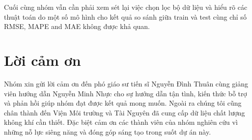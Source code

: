 \documentclass[conference]{IEEEtran}
\begin{document}
Cuối cùng nhóm vẫn cần phải xem sét lại việc chọn lọc bộ dữ liệu và hiểu rõ các thuật toán do một số mô hình cho kết quả so sánh giữa train và test cùng chỉ số RMSE, MAPE and MAE không được khả quan.

\section*{Lời cảm ơn}
Nhóm xin gửi lời cảm ơn đến phó giáo sư tiến sĩ Nguyễn Đình Thuân cùng giảng viên hướng dẫn Nguyễn Minh Nhực cho sự hướng dẫn tận tình, kiến thức bỗ trợ và phản hồi giúp nhóm đạt được kết quả mong muốn. Ngoài ra chúng tôi cũng chân thành đến Viện Môi trường và Tài Nguyên đã cung cấp dữ liệu chất lượng không khí cần thiết. Đặc biệt cảm ơn các thành viên của nhóm nghiên cứu vì những nỗ lực siêng năng và đóng góp sáng tạo trong suốt dự án này.
\end{document}
